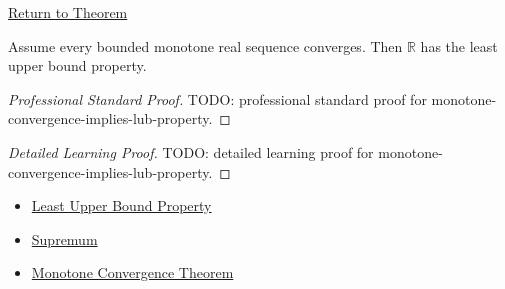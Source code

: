 \newpage
{}
\label{prf:monotone-convergence-implies-lub-property}

\begin{remark*}[Return]
\hyperref[thm:monotone-convergence-implies-lub-property]{Return to Theorem}
\end{remark*}

\begin{theorem*}
Assume every bounded monotone real sequence converges. Then $\mathbb{R}$ has
the least upper bound property.
\end{theorem*}

\begin{proof}[Professional Standard Proof]
\LRAProofBodyStart
TODO: professional standard proof for monotone-convergence-implies-lub-property.
\end{proof}

\begin{proof}[Detailed Learning Proof]
\LRAProofBodyStart
TODO: detailed learning proof for monotone-convergence-implies-lub-property.
\end{proof}

\begin{remark*}
\end{remark*}

\begin{dependencies}
\begin{itemize}
  \item \hyperref[def:least-upper-bound-property]{Least Upper Bound Property}
  \item \hyperref[def:supremum]{Supremum}
  \item \hyperref[thm:monotone-convergence-theorem]{Monotone Convergence Theorem}
\end{itemize}
\end{dependencies}

\clearpage
